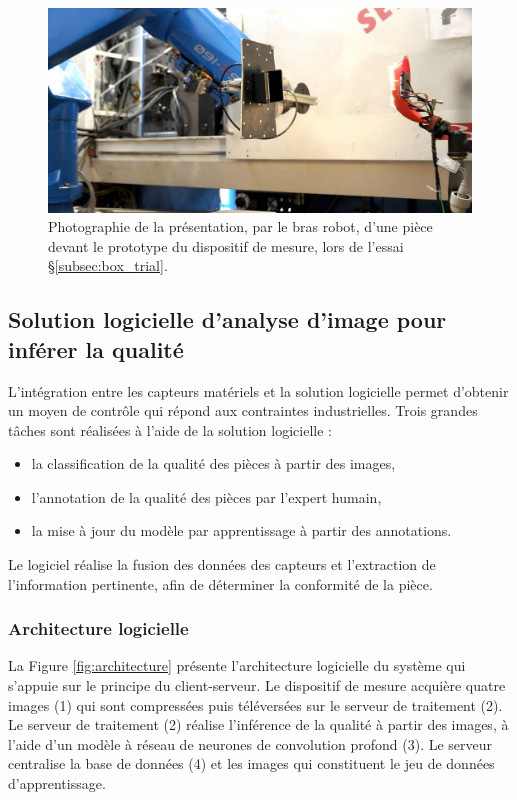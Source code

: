 \begin{figure}[hbtp]
	\centering
	\includegraphics[width=\textwidth,height=\textheight,keepaspectratio]{../Chap5/Figures/TheEye_on.jpg}
	\caption[Photographie de la mesure d'une pièce par notre système]{Photographie de la présentation, par le bras robot, d'une pièce devant le prototype du dispositif de mesure, lors de l'essai §\ref{subsec:box_trial}.}
	\label{fig:theeye_situation}
\end{figure}

\FloatBarrier
\subsection{Solution logicielle d'analyse d'image pour inférer la qualité}
L’intégration entre les capteurs matériels et la solution logicielle permet d’obtenir un moyen de contrôle qui répond aux contraintes industrielles.
Trois grandes tâches sont réalisées à l'aide de la solution logicielle :
\begin{itemize}
	\item la classification de la qualité des pièces à partir des images,
	\item l'annotation de la qualité des pièces par l'expert humain,
	\item la mise à jour du modèle par apprentissage à partir des annotations.
\end{itemize}

Le logiciel réalise la fusion des données des capteurs et l’extraction de l’information pertinente, afin de déterminer la conformité de la pièce.

\subsubsection{Architecture logicielle}
La Figure \ref{fig:architecture} présente l'architecture logicielle du système qui s'appuie sur le principe du client-serveur.
Le dispositif de mesure acquière quatre images (1) qui sont compressées puis téléversées sur le serveur de traitement (2).
Le serveur de traitement (2) réalise l'inférence de la qualité à partir des images, à l'aide d'un modèle à réseau de neurones de convolution profond (3).
Le serveur centralise la base de données (4) et les images qui constituent le jeu de données d'apprentissage.

